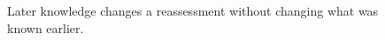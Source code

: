 \begin{figure}[H]
\centering
{}
\caption{Later knowledge changes a reassessment without changing what was known earlier.}\label{fig:teach-M01-06}
\end{figure}

